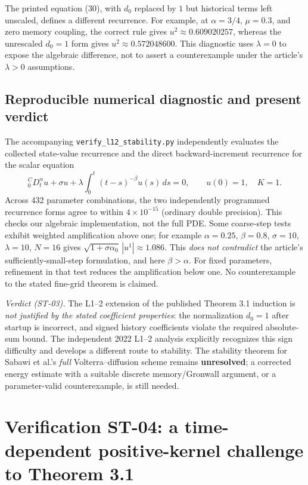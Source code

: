 \documentclass[11pt,a4paper]{amsart}
\theoremstyle{remark}
\theoremstyle{plain}
\theoremstyle{remark}
\numberwithin{equation}{section}
\begin{document}
The printed equation (30), with $d_0$ replaced by $1$ but historical terms left unscaled, defines a different recurrence. For example, at $\alpha=3/4$, $\mu=0.3$, and zero memory coupling, the correct rule gives $u^2\approx0.609020257$, whereas the unrescaled $d_0=1$ form gives $u^2\approx0.572048600$. This diagnostic uses $\lambda=0$ to expose the algebraic difference, not to assert a counterexample under the article's $\lambda>0$ assumptions.

\subsection{Reproducible numerical diagnostic and present verdict}
The accompanying \texttt{verify\_l12\_stability.py} independently evaluates the collected state-value recurrence and the direct backward-increment recurrence for the scalar equation
\[
 {}_0^CD_t^\alpha u+\sigma u+\lambda\int_0^t(t-s)^{-\beta}u(s)\,ds=0,
 \qquad u(0)=1,\quad K=1.
\]
Across 432 parameter combinations, the two independently programmed recurrence forms agree to within $4\times10^{-15}$ (ordinary double precision). This checks our algebraic implementation, not the full PDE. Some coarse-step tests exhibit weighted amplification above one; for example $\alpha=0.25$, $\beta=0.8$, $\sigma=10$, $\lambda=10$, $N=16$ gives $\sqrt{1+\sigma\alpha_0}\,|u^1|\approx1.086$. This \emph{does not contradict} the article's sufficiently-small-step formulation, and here $\beta>\alpha$. For fixed parameters, refinement in that test reduces the amplification below one. No counterexample to the stated fine-grid theorem is claimed.

\noindent\emph{Verdict (ST-03).} The L1--2 extension of the published Theorem 3.1 induction is \emph{not justified by the stated coefficient properties}: the normalization $d_0=1$ after startup is incorrect, and signed history coefficients violate the required absolute-sum bound. The independent 2022 L1--2 analysis explicitly recognizes this sign difficulty and develops a different route to stability. The stability theorem for Sabawi et al.'s \emph{full} Volterra--diffusion scheme remains \textbf{unresolved}; a corrected energy estimate with a suitable discrete memory/Gronwall argument, or a parameter-valid counterexample, is still needed.


\section{Verification ST-04: a time-dependent positive-kernel challenge to Theorem 3.1}
\label{sec:st04-time-kernel}
\end{document}
